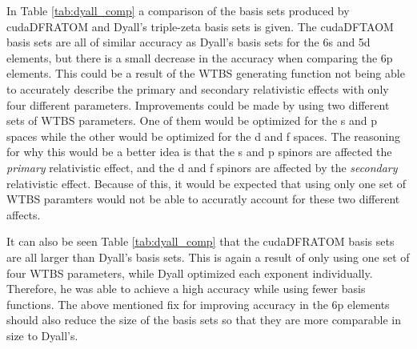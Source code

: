 In Table \ref{tab:dyall_comp} a comparison of the basis sets produced by cudaDFRATOM and Dyall's triple-zeta basis sets\cite{dyall_s,dyall_p,dyall_d} is given. The cudaDFTAOM basis sets are all of similar accuracy as Dyall's basis sets for the 6s and 5d elements, but there is a small decrease in the accuracy when comparing the 6p elements. This could be a result of the WTBS generating function not being able to accurately describe the primary and secondary relativistic effects with only four different parameters. Improvements could be made by using two different sets of WTBS parameters. One of them would be optimized for the s and p spaces while the other would be optimized for the d and f spaces. The reasoning for why this would be a better idea is that the s and p spinors are affected the \textit{primary} relativistic effect, and the d and f spinors are affected by the \textit{secondary} relativistic effect. Because of this, it would be expected that using only one set of WTBS paramters would not be able to accuratly account for these two different affects.

It can also be seen Table \ref{tab:dyall_comp} that the cudaDFRATOM basis sets are all larger than Dyall's basis sets. This is again a result of only using one set of four WTBS parameters, while Dyall optimized each exponent individually. Therefore, he was able to achieve a high accuracy while using fewer basis functions. The above mentioned fix for improving accuracy in the 6p elements should also reduce the size of the basis sets so that they are more comparable in size to Dyall's.

